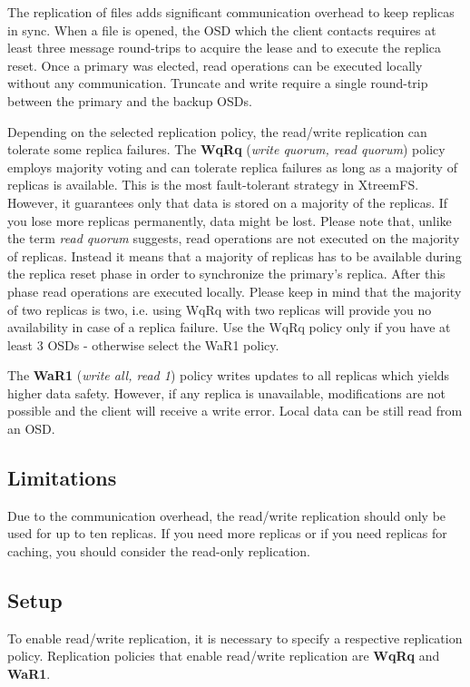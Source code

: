 \documentclass[a4paper,10pt]{book}
\begin{document}
The replication of files adds significant communication overhead to keep replicas in sync. When a file is opened, the OSD which the client contacts requires at least three message round-trips to acquire the lease and to execute the replica reset. Once a primary was elected, read operations can be executed locally without any communication. Truncate and write require a single round-trip between the primary and the backup OSDs.

Depending on the selected replication policy, the read/write replication can tolerate some replica failures. The \textbf{WqRq} (\textit{write quorum, read quorum}) policy employs majority voting and can tolerate replica failures as long as a majority of replicas is available. This is the most fault-tolerant strategy in XtreemFS. However, it guarantees only that data is stored on a majority of the replicas. If you lose more replicas permanently, data might be lost. Please note that, unlike the term \textit{read quorum} suggests, read operations are not executed on the majority of replicas. Instead it means that a majority of replicas has to be available during the replica reset phase in order to synchronize the primary's replica. After this phase read operations are executed locally. Please keep in mind that the majority of two replicas is two, i.e. using WqRq with two replicas will provide you no availability in case of a replica failure. Use the WqRq policy only if you have at least 3 OSDs - otherwise select the WaR1 policy.

The \textbf{WaR1} (\textit{write all, read 1}) policy writes updates to all replicas which yields higher data safety. However, if any replica is unavailable, modifications are not possible and the client will receive a write error. Local data can be still read from an OSD.

\subsection{Limitations}
Due to the communication overhead, the read/write replication should only be used for up to ten replicas. If you need more replicas or if you need replicas for caching, you should consider the read-only replication.

\subsection{Setup}
To enable read/write replication, it is necessary to specify a respective replication policy. Replication policies that enable read/write replication are \textbf{WqRq} and \textbf{WaR1}.
\end{document}
